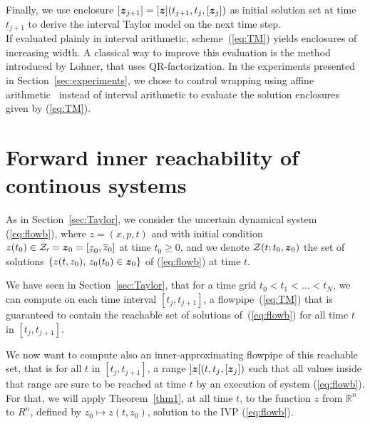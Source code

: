\documentclass{sig-alternate-05-2015} %
\newcommand\ForAuthors[1]%
 {\par\smallskip                     %
  \begin{center}%
   \fbox%
   {\parbox{0.9\linewidth}%
    {\raggedright\sc--- #1}%
   }%
  \end{center}%
  \par\smallskip                     %
 }
\def\R{{\mathbb R}}
\newcommand{\addTODO}[1]{\addcontentsline{tdo}{toc}{#1}}
\newcommand{\TODO}[1]{{\bf{\scriptsize #1}\addTODO{#1}}}
\newcommand{\SP}[1]{\TODO{Sylvie : #1}}
\begin{document}

Finally, we use enclosure $[{\z}_{j+1}]=[\z](t_{j+1},t_j,[{\z}_j])$ as initial solution set at time $t_{j+1}$ to derive the interval Taylor model on the next time step. \\

If evaluated plainly in interval arithmetic, scheme~(\ref{eq:TM}) yields enclosures of increasing width. A classical way to improve 
this evaluation is the method introduced by Lohner, that uses QR-factorization.
In the experiments presented in Section~\ref{sec:experiments}, we chose to control wrapping using affine arithmetic~\cite{com-sto-93-aa} instead of interval arithmetic to evaluate the solution enclosures given by (\ref{eq:TM}). 

\section{Forward inner reachability of continous systems}
\label{sec:inner_reachability}

As in Section~\ref{sec:Taylor}, we consider the uncertain dynamical system (\ref{eq:flowb}), where $z=(x,p,t)$ and with initial condition 
$z(t_0) \in {\cal Z_0} = \z_0=[\underline{z}_0,\overline{z}_0]$ at time $t_0 \geq 0$, and we denote ${\cal Z}(t;t_0, \z_0)$
 the set of solutions $\{ z(t,z_0), \, z_0(t_0) \in \z_0 \}$ of  (\ref{eq:flowb}) at time $t$. 

We have seen in  Section~\ref{sec:Taylor}, that for a  time grid $t_0 < t_1 < \ldots < t_N$, we can compute on each time interval  $[t_j,t_{j+1}]$,
a flowpipe~(\ref{eq:TM}) 
that is guaranteed to contain the reachable set of solutions of~(\ref{eq:flowb}) for all time $t$ in $[t_j,t_{j+1}]$. 

We now want to compute also an inner-approximating flowpipe of this reachable set, that is for all $t$ in $[t_j,t_{j+1}]$, 
a range $]\z[(t,t_j,[\z_j])$ such that all values inside that range are sure to be reached at time $t$ by an execution of system (\ref{eq:flowb}).
For that, we will apply Theorem~\ref{thm1}, at all time $t$, to the function $z$ from $\R^n$ to $R^n$, defined by 
$z_0 \mapsto z(t,z_0)$, solution to the IVP (\ref{eq:flowb}). 
\end{document}
